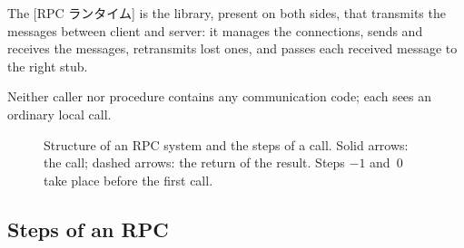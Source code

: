 \documentclass[../main.tex]{subfiles}
\begin{document}
\begin{definition}
  The [RPC ランタイム] is the library, present on both
  sides, that transmits the messages between client and server: it manages
  the connections, sends and receives the messages, retransmits lost ones,
  and passes each received message to the right stub.
\end{definition}

Neither caller nor procedure contains any communication code; each sees
an ordinary local call.

\begin{figure}[htbp]
  \centering
  
  \caption{Structure of an RPC system and the steps of a call.  Solid
    arrows: the call; dashed arrows: the return of the result.  Steps $-1$
    and~0 take place before the first call.}
  \label{fig:l13-steps}
\end{figure}

\subsection{Steps of an RPC}
\end{document}
